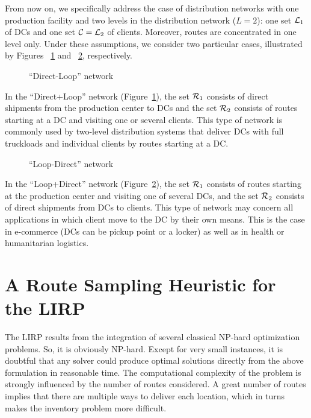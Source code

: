 \documentclass[a4paper,10pt]{article}
\begin{document}
\begin{linenumbers}
From now on, we specifically address the case of distribution networks with one production facility and two levels
in the distribution network ($L=2$): one set $\mathcal{L}_1$ of DCs and one set $\mathcal{C}=\mathcal{L}_2$ of clients. 
Moreover, routes are concentrated in one level only. 
Under these assumptions, we consider two particular cases, illustrated by Figures ~\ref{fig:dl} and ~\ref{fig:ld}, respectively. 

\begin{figure}[htbp]
	\centering
	\caption{ ``Direct-Loop'' network}
	\label{fig:dl}
	
\end{figure}

In the ``Direct+Loop'' network (Figure~\ref{fig:dl}), the set $\mathcal{R}_1$ consists of direct shipments from the production center to DCs  and the set $\mathcal{R}_2$ consists of routes starting at a DC and visiting one or several clients.  This type of network is commonly used by two-level distribution systems that deliver DCs with full truckloads and individual clients by routes starting at a DC.

\begin{figure}[htbp]
	\centering
	\caption{``Loop-Direct'' network}
	\label{fig:ld}
\end{figure}
 
 
In the ``Loop+Direct'' network (Figure~\ref{fig:ld}), the set $\mathcal{R}_1$  consists of routes starting at the production center and visiting one of several DCs, and the set $\mathcal{R}_2$ consists of direct shipments from DCs to clients. This type of network may concern all applications in which client move to the DC by their own means. This is the case in e-commerce (DCs can be pickup point or a locker) as well as in health or humanitarian logistics. 




\section{A Route Sampling Heuristic for the LIRP} 
\label{sec:algo}

The LIRP  results from the integration of several classical NP-hard optimization problems. So, it is obviously NP-hard.
Except for very small instances, it is doubtful that any solver could produce optimal solutions directly from the above formulation in reasonable time. The computational complexity of the problem is strongly influenced by the number of routes considered. A great number of routes implies that there are multiple ways to deliver each location, which in turns makes the inventory problem more difficult. 


\end{linenumbers}
\end{document}

